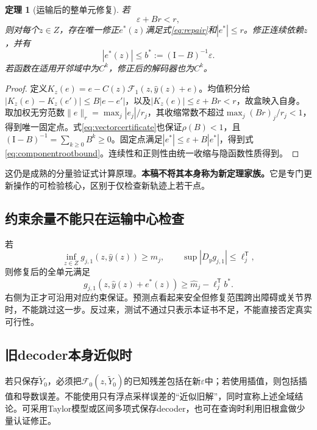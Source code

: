 \documentclass[UTF8,11pt,a4paper,fontset=fandol]{ctexart}
\numberwithin{equation}{section}
\newtheorem{theorem}{定理}[section]
\theoremstyle{definition}
\newcommand{\Id}{\mathrm I}
\newcommand{\T}{^{\mathsf T}}
\begin{document}
\begin{theorem}[运输后的整单元修复]
若
\begin{equation}
 \boxed{\varepsilon+Br<r,}
 \label{eq:vectorcertificate}
\end{equation}
则对每个$z\in Z$，存在唯一修正$e^*(z)$满足式\eqref{eq:repair}和$|e^*|\le r$。修正连续依赖$z$，并有
\begin{equation}
 \boxed{|e^*(z)|\le b^*:=(\Id-B)^{-1}\varepsilon.}
 \label{eq:componentrootbound}
\end{equation}
若函数在适用开邻域中为$C^k$，修正后的解码器也为$C^k$。
\end{theorem}
\begin{proof}
定义$K_z(e)=e-C(z)\mathcal F_1(z,\widehat y(z)+e)$。均值积分给
$|K_z(e)-K_z(e')|\le B|e-e'|$，以及$|K_z(e)|\le\varepsilon+Br<r$，故盒映入自身。取加权无穷范数$\|e\|_r=\max_j|e_j|/r_j$，其收缩常数不超过$\max_j(Br)_j/r_j<1$，得到唯一固定点。式\eqref{eq:vectorcertificate}也保证$\rho(B)<1$，且$(\Id-B)^{-1}=\sum_{k\ge0}B^k\ge0$。固定点满足$|e^*|\le\varepsilon+B|e^*|$，得到式\eqref{eq:componentrootbound}。连续性和正则性由统一收缩与隐函数性质得到。
\end{proof}
这仍是成熟的分量验证式计算原理\cite{rump,dufflee}。\textbf{本稿不将其本身称为新定理家族。}它是专门更新操作的可检验核心，区别于仅检查新轨迹上若干点。

\subsection{约束余量不能只在运输中心检查}
若
\begin{equation}
 \inf_{z\in Z}g_{j,1}(z,\widehat y(z))\ge\widehat m_j,
 \qquad
 \sup|D_yg_{j,1}|\le\ell_j\T,
\end{equation}
则修复后的全单元满足
\begin{equation}
 \boxed{g_{j,1}(z,\widehat y(z)+e^*(z))
 \ge\widehat m_j-\ell_j\T b^*.}
 \label{eq:margin}
\end{equation}
右侧为正才可沿用对应约束保证。预测点看起来安全但修复范围跨出障碍或关节界时，不能跳过这一步。反过来，测试不通过只表示本证书不足，不能直接否定真实可行性。

\subsection{旧decoder本身近似时}
若只保存$\widetilde Y_0$，必须把$\mathcal F_0(z,\widetilde Y_0)$的已知残差包括在新$\varepsilon$中；若使用插值，则包括插值和导数误差。不能使用只有浮点采样误差的“近似旧解”，同时宣称上述全域结论。可采用Taylor模型或区间多项式保存decoder，也可在查询时利用旧根盒做少量认证修正。
\end{document}
